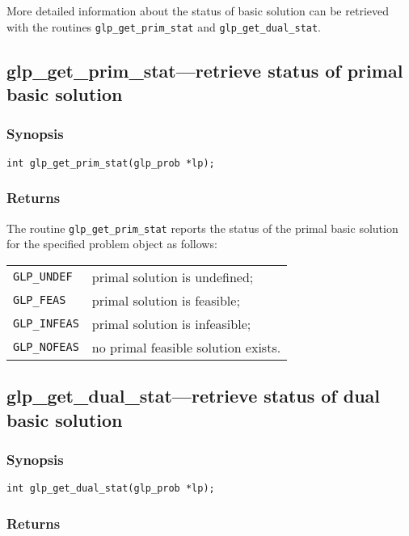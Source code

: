 More detailed information about the status of basic solution can be
retrieved with the routines \verb|glp_get_prim_stat| and
\verb|glp_get_dual_stat|.

\newpage

\subsection{glp\_get\_prim\_stat---retrieve status of primal basic
solution}

\subsubsection*{Synopsis}

\begin{verbatim}
int glp_get_prim_stat(glp_prob *lp);
\end{verbatim}

\subsubsection*{Returns}

The routine \verb|glp_get_prim_stat| reports the status of the primal
basic solution for the specified problem object as follows:

\begin{tabular}{@{}ll}
\verb|GLP_UNDEF|  & primal solution is undefined; \\
\verb|GLP_FEAS|   & primal solution is feasible; \\
\verb|GLP_INFEAS| & primal solution is infeasible; \\
\verb|GLP_NOFEAS| & no primal feasible solution exists. \\
\end{tabular}

\subsection{glp\_get\_dual\_stat---retrieve status of dual basic
solution}

\subsubsection*{Synopsis}

\begin{verbatim}
int glp_get_dual_stat(glp_prob *lp);
\end{verbatim}

\subsubsection*{Returns}

